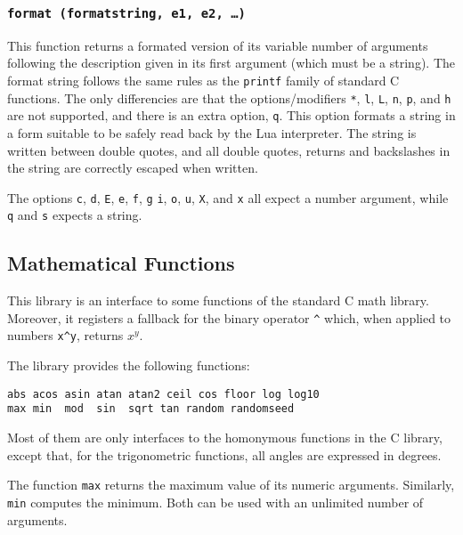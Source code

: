\subsubsection*{{\tt format (formatstring, e1, e2, \ldots)}}
\label{format}
This function returns a formated version of its variable number of arguments
following the description given in its first argument (which must be a string). 
The format string follows the same rules as the \verb'printf' family of
standard C functions.
The only differencies are that the options/modifiers
\verb'*', \verb'l', \verb'L', \verb'n', \verb'p',
and \verb'h' are not supported,
and there is an extra option, \verb'q'.
This option formats a string in a form suitable to be safely read
back by the Lua interpreter.
The string is written between double quotes,
and all double quotes, returns and backslashes in the string
are correctly escaped when written.

The options \verb'c', \verb'd', \verb'E', \verb'e', \verb'f',
\verb'g' \verb'i', \verb'o', \verb'u', \verb'X', and \verb'x' all
expect a number argument,
while \verb'q' and \verb's' expects a string.


\subsection{Mathematical Functions} \label{mathlib}

This library is an interface to some functions of the standard C math library.
Moreover, it registers a fallback for the binary operator \verb'^' which,
when applied to numbers \verb'x^y', returns $x^y$.

The library provides the following functions:
\begin{verbatim}
abs acos asin atan atan2 ceil cos floor log log10
max min  mod  sin  sqrt tan random randomseed
\end{verbatim}
Most of them
are only interfaces to the homonymous functions in the C library,
except that, for the trigonometric functions,
all angles are expressed in degrees.

The function \verb'max' returns the maximum
value of its numeric arguments.
Similarly, \verb'min' computes the minimum.
Both can be used with an unlimited number of arguments.

